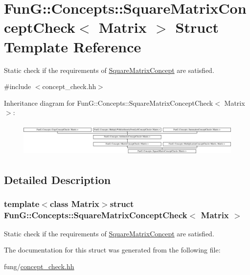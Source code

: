 \hypertarget{structFunG_1_1Concepts_1_1SquareMatrixConceptCheck}{\section{Fun\-G\-:\-:Concepts\-:\-:Square\-Matrix\-Concept\-Check$<$ Matrix $>$ Struct Template Reference}
\label{structFunG_1_1Concepts_1_1SquareMatrixConceptCheck}
}


Static check if the requirements of \hyperlink{structFunG_1_1Concepts_1_1SquareMatrixConcept}{Square\-Matrix\-Concept} are satisfied.  




{\ttfamily \#include $<$concept\-\_\-check.\-hh$>$}

Inheritance diagram for Fun\-G\-:\-:Concepts\-:\-:Square\-Matrix\-Concept\-Check$<$ Matrix $>$\-:\begin{figure}[H]
\begin{center}
\leavevmode
\includegraphics[height=1.728395cm]{structFunG_1_1Concepts_1_1SquareMatrixConceptCheck}
\end{center}
\end{figure}


\subsection{Detailed Description}
\subsubsection*{template$<$class Matrix$>$struct Fun\-G\-::\-Concepts\-::\-Square\-Matrix\-Concept\-Check$<$ Matrix $>$}

Static check if the requirements of \hyperlink{structFunG_1_1Concepts_1_1SquareMatrixConcept}{Square\-Matrix\-Concept} are satisfied. 

The documentation for this struct was generated from the following file\-:\begin{DoxyCompactItemize}
\item 
fung/\hyperlink{concept__check_8hh}{concept\-\_\-check.\-hh}\end{DoxyCompactItemize}
